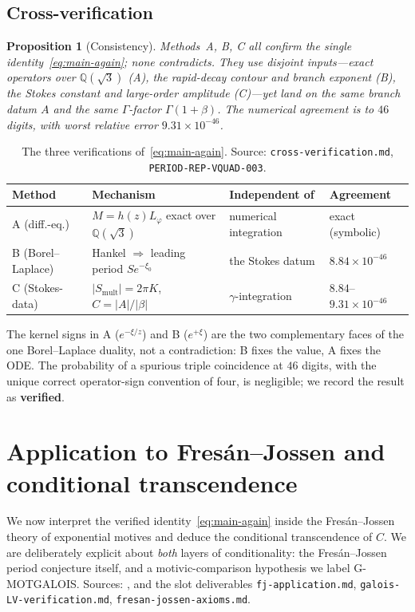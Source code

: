 \documentclass[11pt,reqno]{amsart}
\theoremstyle{plain}
\newtheorem{proposition}[theorem]{Proposition}
\theoremstyle{definition}
\newcommand{\Lphi}{L_{\varphi}}
\newcommand{\Qsqrt}{\mathbb{Q}(\sqrt3)}
\newcommand{\xizero}{\xi_0}
\providecommand{\C}{}\renewcommand{\C}{C}
\begin{document}
\subsection{Cross-verification}\label{sub:cross}
\begin{proposition}[Consistency]\label{prop:cross}
Methods~A, B, C all confirm the single identity~\eqref{eq:main-again}; none contradicts. They use
disjoint inputs---exact operators over $\Qsqrt$ (A), the rapid-decay contour and branch exponent
(B), the Stokes constant and large-order amplitude (C)---yet land on the same branch datum $A$ and
the same $\Gamma$-factor $\Gamma(1+\beta)$. The numerical agreement is to $46$ digits, with worst
relative error $9.31\times10^{-46}$.
\end{proposition}

\begin{table}[h]
\centering
\begin{tabular}{@{}llll@{}}
\hline
Method & Mechanism & Independent of & Agreement \\
\hline
A (diff.-eq.) & $M=h(z)\Lphi$ exact over $\Qsqrt$ & numerical integration & exact (symbolic) \\
B (Borel--Laplace) & Hankel $\Rightarrow$ leading period $S e^{-\xizero}$ & the Stokes datum & $8.84\times10^{-46}$ \\
C (Stokes-data) & $\lvert S_{\mathrm{mult}}\rvert=2\pi K$, $\C=\lvert A\rvert/\lvert\beta\rvert$ & $\gamma$-integration & $8.84$--$9.31\times10^{-46}$ \\
\hline
\end{tabular}
\caption{The three verifications of~\eqref{eq:main-again}. Source:
\texttt{cross-verification.md}, \texttt{PERIOD-REP-VQUAD-003}.}
\label{tab:methods}
\end{table}

The kernel signs in A ($e^{-\xi/z}$) and B ($e^{+\xi}$) are the two complementary faces of the one
Borel--Laplace duality, not a contradiction: B fixes the value, A fixes the ODE. The probability of
a spurious triple coincidence at $46$ digits, with the unique correct operator-sign convention of
four, is negligible; we record the result as \textbf{verified}.

\section{Application to Fres\'an--Jossen and conditional transcendence}\label{sec:fj}

We now interpret the verified identity~\eqref{eq:main-again} inside the Fres\'an--Jossen theory of
exponential motives and deduce the conditional transcendence of $\C$. We are deliberately explicit
about \emph{both} layers of conditionality: the Fres\'an--Jossen period conjecture itself, and a
motivic-comparison hypothesis we label G-MOTGALOIS. Sources: \cite{FJ}, and the slot deliverables
\texttt{fj-application.md}, \texttt{galois-LV-verification.md}, \texttt{fresan-jossen-axioms.md}.
\end{document}
